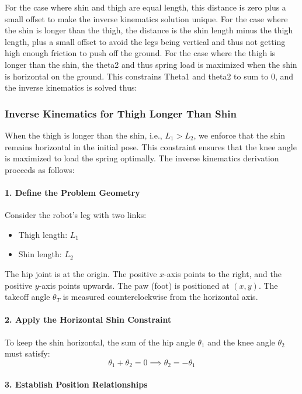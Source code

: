 For the case where shin and thigh are equal length, this distance is zero plus a small offset to make the inverse kinematics solution unique. 
For the case where the shin is longer than the thigh, the distance is the shin length minus the thigh length, plus a small offset to avoid the legs being vertical and thus not getting high enough friction to push off the ground.
For the case where the thigh is longer than the shin, the theta2 and thus spring load is maximized when the shin is horizontal on the ground. This constrains Theta1 and theta2 to sum to 0, and the inverse kinematics is solved thus: 
\subsubsection{Inverse Kinematics for Thigh Longer Than Shin}

When the thigh is longer than the shin, i.e., \( L_1 > L_2 \), we enforce that the shin remains horizontal in the initial pose. This constraint ensures that the knee angle is maximized to load the spring optimally. The inverse kinematics derivation proceeds as follows:

\paragraph{1. Define the Problem Geometry}

Consider the robot's leg with two links:
\begin{itemize}
    \item Thigh length: \( L_1 \)
    \item Shin length: \( L_2 \)
\end{itemize}
The hip joint is at the origin. The positive \( x \)-axis points to the right, and the positive \( y \)-axis points upwards. The paw (foot) is positioned at \( (x, y) \). The takeoff angle \( \theta_T \) is measured counterclockwise from the horizontal axis.

\paragraph{2. Apply the Horizontal Shin Constraint}

To keep the shin horizontal, the sum of the hip angle \( \theta_1 \) and the knee angle \( \theta_2 \) must satisfy:
\[
\theta_1 + \theta_2 = 0 \implies \theta_2 = -\theta_1
\]

\paragraph{3. Establish Position Relationships}

